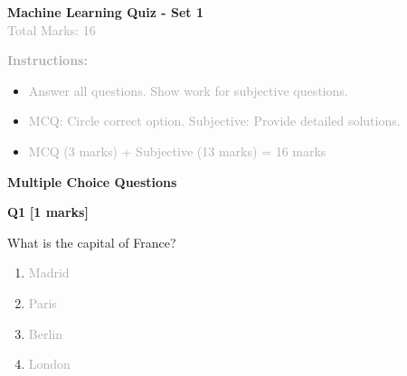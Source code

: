 \documentclass[10pt,twocolumn]{article}
\begin{document}
\begin{center}
\textcolor{primaryblue}{\large\textbf{Machine Learning Quiz - Set 1}}\\
\textcolor{darkgray}{\small Total Marks: 16}
\end{center}

\begin{compactinstruction}
\textcolor{darkgray}{\small\textbf{Instructions:}}
\begin{itemize}[leftmargin=15pt, itemsep=1pt, parsep=0pt]
  \item \textcolor{darkgray}{\small Answer all questions. Show work for subjective questions.}
  \item \textcolor{darkgray}{\small MCQ: Circle correct option. Subjective: Provide detailed solutions.}  
  \item \textcolor{darkgray}{\small MCQ (3 marks) + Subjective (13 marks) = 16 marks}
\end{itemize}
\end{compactinstruction}

\vspace{4pt}


\textcolor{primaryblue}{\textbf{Multiple Choice Questions}}
\vspace{2pt}


\begin{compactmcq}
\textcolor{primaryblue}{\small\textbf{Q1}} \hfill \textcolor{accentorange}{\small\textbf{[1 marks]}}

\small What is the capital of France?

\vspace{2pt}
\begin{multicols}{2}
\begin{enumerate}[label=\textbf{(\Alph*)}, leftmargin=15pt, itemsep=1pt, parsep=0pt]

  \item \textcolor{darkgray}{\small Madrid}

  \item \textcolor{darkgray}{\small Paris}

  \item \textcolor{darkgray}{\small Berlin}

  \item \textcolor{darkgray}{\small London}

\end{enumerate}
\end{multicols}
\end{compactmcq}
\vspace{2pt}
\end{document}
